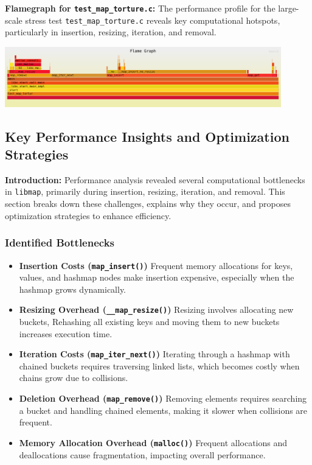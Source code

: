 \documentclass[titlepage]{article}
\begin{document}
\textbf{Flamegraph for \texttt{test\_map\_torture.c}:}
The performance profile for the large-scale stress test \texttt{test\_map\_torture.c} reveals key computational hotspots, particularly in insertion, resizing, iteration, and removal.

\begin{center}
    \includegraphics[width=0.9\textwidth]{flamegraph.pdf}
\end{center}

\subsection{Key Performance Insights and Optimization Strategies}

\textbf{Introduction:}
Performance analysis revealed several computational bottlenecks in \texttt{libmap}, primarily during insertion, resizing, iteration, and removal. This section breaks down these challenges, explains why they occur, and proposes optimization strategies to enhance efficiency.

\subsubsection{Identified Bottlenecks}

\begin{itemize}
    \item \textbf{Insertion Costs (\texttt{map\_insert()})}
    Frequent memory allocations for keys, values, and hashmap nodes make insertion expensive, especially when the hashmap grows dynamically.

    \item \textbf{Resizing Overhead (\texttt{\_\_map\_resize()})}
    Resizing involves allocating new buckets, Rehashing all existing keys and moving them to new buckets increases execution time.

    \item \textbf{Iteration Costs (\texttt{map\_iter\_next()})}
    Iterating through a hashmap with chained buckets requires traversing linked lists, which becomes costly when chains grow due to collisions.

    \item \textbf{Deletion Overhead (\texttt{map\_remove()})}
    Removing elements requires searching a bucket and handling chained elements, making it slower when collisions are frequent.

    \item \textbf{Memory Allocation Overhead (\texttt{malloc()})}
    Frequent allocations and deallocations cause fragmentation, impacting overall performance.
\end{itemize}
\end{document}
